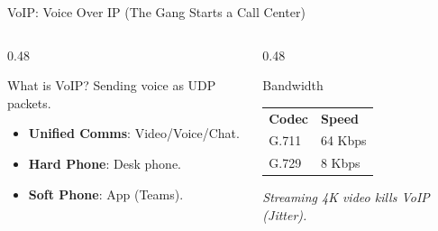 \documentclass[aspectratio=169]{beamer}  %
\begin{document}
\begin{frame}{VoIP: Voice Over IP (The Gang Starts a Call Center)}
    \begin{columns}[T]
        \begin{column}{0.48\textwidth}
            \begin{block}{What is VoIP?}
                \small
                Sending voice as UDP packets.
                \begin{itemize}
                    \item \textbf{Unified Comms}: Video/Voice/Chat.
                    \item \textbf{Hard Phone}: Desk phone.
                    \item \textbf{Soft Phone}: App (Teams).
                \end{itemize}
            \end{block}
        \end{column}
        \begin{column}{0.48\textwidth}
            \begin{alertblock}{Bandwidth}
                \small
                \begin{tabular}{l l}
                    \textbf{Codec} & \textbf{Speed} \\
                    G.711 & 64 Kbps \\
                    G.729 & 8 Kbps \\
                \end{tabular}
                \vspace{0.2em}
                \textit{Streaming 4K video kills VoIP (Jitter).}
            \end{alertblock}
        \end{column}
    \end{columns}
    \begin{center}
    \end{center}
\end{frame}
\end{document}

